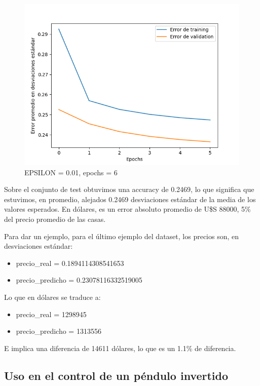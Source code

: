 \documentclass[
]{article}
\providecommand{\tightlist}{%
  \setlength{\itemsep}{0pt}\setlength{\parskip}{0pt}}
\begin{document}
\begin{figure}
\centering
\includegraphics{mlp_imgs/error_eps001_epochsfixed.png}
\caption{EPSILON = 0.01, epochs = 6}
\end{figure}

Sobre el conjunto de test obtuvimos una accuracy de 0.2469, lo que
significa que estuvimos, en promedio, alejados 0.2469 desviaciones
estándar de la media de los valores esperados. En dólares, es un error
absoluto promedio de U\$S 88000, 5\% del precio promedio de las casas.

Para dar un ejemplo, para el último ejemplo del dataset, los precios
son, en desviaciones estándar:

\begin{itemize}
\tightlist
\item
  precio\_real = 0.1894114308541653
\item
  precio\_predicho = 0.23078116332519005
\end{itemize}

Lo que en dólares se traduce a:

\begin{itemize}
\tightlist
\item
  precio\_real = 1298945
\item
  precio\_predicho = 1313556
\end{itemize}

E implica una diferencia de 14611 dólares, lo que es un 1.1\% de
diferencia.

\hypertarget{uso-en-el-control-de-un-puxe9ndulo-invertido}{%
\subsection{Uso en el control de un péndulo
invertido}\label{uso-en-el-control-de-un-puxe9ndulo-invertido}}
\end{document}
